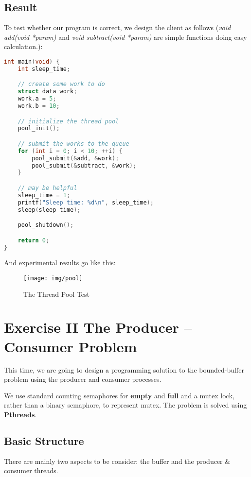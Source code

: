 \documentclass{article}
\begin{document}
\subsection*{Result}
To test whether our program is correct, we design the client as follows (\textit{void add(void *param)} and \textit{void subtract(void *param)} are simple functions doing easy calculation.):

\begin{lstlisting}[language=c, caption={client.c}]
int main(void) {
    int sleep_time;

    // create some work to do
    struct data work;
    work.a = 5;
    work.b = 10;

    // initialize the thread pool
    pool_init();

    // submit the works to the queue
    for (int i = 0; i < 10; ++i) {
        pool_submit(&add, &work);
        pool_submit(&subtract, &work);
    }

    // may be helpful 
    sleep_time = 1;
    printf("Sleep time: %d\n", sleep_time);
    sleep(sleep_time);

    pool_shutdown();

    return 0;
}
\end{lstlisting}

And experimental results go like this:

\begin{figure}[h]
    \centering
    
    \texttt{[image: img/pool]}
    \caption{The Thread Pool Test}
    \label{}
\end{figure}

\section*{Exercise II The Producer – Consumer Problem}
This time, we are going to design a programming solution to the bounded-buffer problem using the producer and consumer processes.

We use standard counting semaphores
for \textbf{empty} and \textbf{full} and a mutex lock, rather than a binary semaphore, to
represent mutex. The problem is solved using \textbf{Pthreads}.

\subsection*{Basic Structure}
There are mainly two aspects to be consider: the buffer and the producer \& consumer threads.
\end{document}
